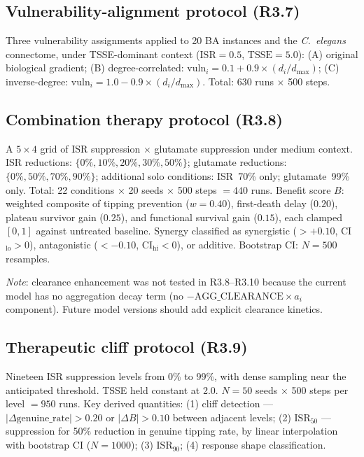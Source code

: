 \documentclass[12pt,a4paper]{article}
\begin{document}
\subsection{Vulnerability-alignment protocol (R3.7)}

Three vulnerability assignments applied to 20 BA instances and the \textit{C.~elegans}
connectome, under TSSE-dominant context ($\mathrm{ISR}=0.5$, $\mathrm{TSSE}=5.0$):
(A) original biological gradient; (B) degree-correlated: $\mathrm{vuln}_i = 0.1 + 0.9 \times
(d_i / d_{\max})$; (C) inverse-degree: $\mathrm{vuln}_i = 1.0 - 0.9 \times
(d_i / d_{\max})$. Total: 630 runs $\times$ 500 steps.

\subsection{Combination therapy protocol (R3.8)}

A $5{\times}4$ grid of ISR suppression $\times$ glutamate suppression under medium context.
ISR reductions: $\{0\%, 10\%, 20\%, 30\%, 50\%\}$; glutamate reductions: $\{0\%, 50\%, 70\%,
90\%\}$; additional solo conditions: ISR~70\% only; glutamate~99\% only. Total: 22 conditions
$\times$ 20 seeds $\times$ 500 steps $= 440$ runs. Benefit score $B$: weighted composite of
tipping prevention ($w = 0.40$), first-death delay ($0.20$), plateau survivor gain ($0.25$),
and functional survival gain ($0.15$), each clamped $[0,1]$ against untreated baseline.
Synergy classified as synergistic ($> +0.10$, CI$_{\mathrm{lo}} > 0$), antagonistic ($< -0.10$,
CI$_{\mathrm{hi}} < 0$), or additive. Bootstrap CI: $N = 500$ resamples.

\textit{Note}: clearance enhancement was not tested in R3.8--R3.10 because the current model
has no aggregation decay term (no $-\mathrm{AGG\_CLEARANCE}\times a_i$ component). Future
model versions should add explicit clearance kinetics.

\subsection{Therapeutic cliff protocol (R3.9)}

Nineteen ISR suppression levels from 0\% to 99\%, with dense sampling near the anticipated
threshold. TSSE held constant at 2.0. $N = 50$ seeds $\times$ 500 steps per level $= 950$ runs.
Key derived quantities: (1) cliff detection --- $|\Delta\text{genuine\_rate}| > 0.20$ or
$|\Delta B| > 0.10$ between adjacent levels; (2) $\mathrm{ISR}_{50}$ --- suppression for 50\%
reduction in genuine tipping rate, by linear interpolation with bootstrap CI ($N = 1000$);
(3) $\mathrm{ISR}_{90}$; (4) response shape classification.
\end{document}
